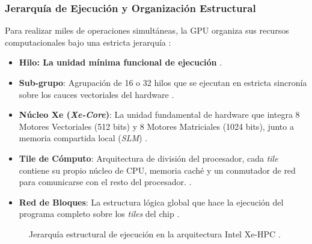 \documentclass[12pt,a4paper]{article}
\begin{document}
\subsubsection{Jerarquía de Ejecución y Organización Estructural}
Para realizar miles de operaciones simultáneas, la GPU organiza sus recursos computacionales bajo una estricta jerarquía \cite{intel_pontevecchio}:
\begin{itemize}[leftmargin=*]
    \item \textbf{Hilo: La unidad mínima funcional de ejecución} \cite{intel_pontevecchio}.
    \item \textbf{Sub-grupo}: Agrupación de 16 o 32 hilos que se ejecutan en estricta sincronía sobre los cauces vectoriales del hardware \cite{intel_pontevecchio}.
    \item \textbf{Núcleo Xe (\textit{Xe-Core})}: La unidad fundamental de hardware que integra 8 Motores Vectoriales (512 bits) y 8 Motores Matriciales  (1024 bits), junto a memoria compartida local (\textit{SLM}) \cite{intel_pontevecchio}.
    \item \textbf{Tile de Cómputo}: Arquitectura de división del procesador, cada \textit{tile} contiene su propio núcleo de CPU, memoria caché y un conmutador de red para comunicarse con el resto del procesador.   \cite{intel_pontevecchio}.
    \item \textbf{Red de Bloques}: La estructura lógica global que hace la ejecución del programa completo sobre los \textit{tiles} del chip \cite{intel_pontevecchio}.
\end{itemize}

\begin{figure}[H]
\centering
{}
\caption{Jerarquía estructural de ejecución en la arquitectura Intel Xe-HPC \cite{intel_pontevecchio}.}
\label{fig:gpu_hierarchy}
\end{figure}
\end{document}
